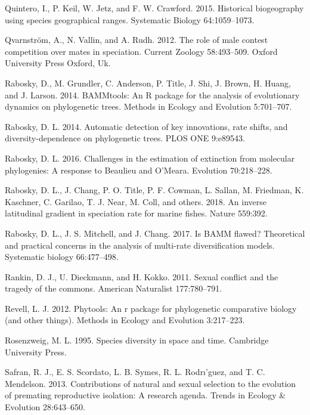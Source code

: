\documentclass[]{article}
\begin{document}
\leavevmode\hypertarget{ref-Quintero_2015}{}%
Quintero, I., P. Keil, W. Jetz, and F. W. Crawford. 2015. Historical
biogeography using species geographical ranges. Systematic Biology
64:1059--1073.

\leavevmode\hypertarget{ref-Qvarnstrom_2012}{}%
Qvarnström, A., N. Vallin, and A. Rudh. 2012. The role of male contest
competition over mates in speciation. Current Zoology 58:493--509.
Oxford University Press Oxford, Uk.

\leavevmode\hypertarget{ref-bammtools_2014}{}%
Rabosky, D., M. Grundler, C. Anderson, P. Title, J. Shi, J. Brown, H.
Huang, and J. Larson. 2014. BAMMtools: An R package for the analysis of
evolutionary dynamics on phylogenetic trees. Methods in Ecology and
Evolution 5:701--707.

\leavevmode\hypertarget{ref-Rabosky_2014}{}%
Rabosky, D. L. 2014. Automatic detection of key innovations, rate
shifts, and diversity-dependence on phylogenetic trees. PLOS ONE
9:e89543.

\leavevmode\hypertarget{ref-Rabosky_Extinction_2016}{}%
Rabosky, D. L. 2016. Challenges in the estimation of extinction from
molecular phylogenies: A response to Beaulieu and O'Meara. Evolution
70:218--228.

\leavevmode\hypertarget{ref-Rabosky_fish_2018}{}%
Rabosky, D. L., J. Chang, P. O. Title, P. F. Cowman, L. Sallan, M.
Friedman, K. Kaschner, C. Garilao, T. J. Near, M. Coll, and others.
2018. An inverse latitudinal gradient in speciation rate for marine
fishes. Nature 559:392.

\leavevmode\hypertarget{ref-Rabosky_BAMM_flawed_2017}{}%
Rabosky, D. L., J. S. Mitchell, and J. Chang. 2017. Is BAMM flawed?
Theoretical and practical concerns in the analysis of multi-rate
diversification models. Systematic biology 66:477--498.

\leavevmode\hypertarget{ref-Rankin_2011}{}%
Rankin, D. J., U. Dieckmann, and H. Kokko. 2011. Sexual conflict and the
tragedy of the commons. American Naturalist 177:780--791.

\leavevmode\hypertarget{ref-phytools_2012}{}%
Revell, L. J. 2012. Phytools: An r package for phylogenetic comparative
biology (and other things). Methods in Ecology and Evolution 3:217--223.

\leavevmode\hypertarget{ref-Rosenzweig_1995}{}%
Rosenzweig, M. L. 1995. Species diversity in space and time. Cambridge
University Press.

\leavevmode\hypertarget{ref-Safran_2013}{}%
Safran, R. J., E. S. Scordato, L. B. Symes, R. L. Rodrı'guez, and T. C.
Mendelson. 2013. Contributions of natural and sexual selection to the
evolution of premating reproductive isolation: A research agenda. Trends
in Ecology \& Evolution 28:643--650.
\end{document}
